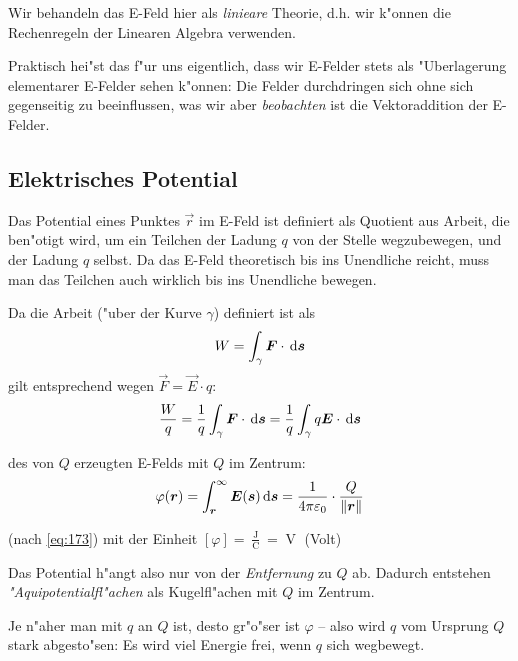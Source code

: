 Wir behandeln das E-Feld hier als \emph{linieare} Theorie, d.h. wir
k"onnen die Rechenregeln der Linearen Algebra verwenden.

Praktisch hei"st das f"ur uns eigentlich, dass wir E-Felder stets als
"Uberlagerung elementarer E-Felder sehen k"onnen: Die Felder
durchdringen sich ohne sich gegenseitig zu beeinflussen, was wir aber
\emph{beobachten} ist die Vektoraddition der E-Felder.





\subsection{Elektrisches Potential}
\label{kap_elektrisches-potential}

Das Potential eines Punktes $\vec r$ im E-Feld ist definiert als
Quotient aus Arbeit, die ben"otigt wird, um ein Teilchen der Ladung $q$
von der Stelle wegzubewegen, und der Ladung $q$ selbst. Da das E-Feld
theoretisch bis ins Unendliche reicht, muss man das Teilchen auch
wirklich bis ins Unendliche bewegen.

Da die Arbeit ("uber der Kurve $\gamma$) definiert ist als
$$
W = \int_\gamma \boldsymbol{F} \cdot \, \mathrm{d} \boldsymbol{s}
$$
gilt entsprechend wegen $ \vec F = \vec E \cdot q$:
\begin{equation*}
   \label{eq:186}
   \frac{W}{q} = \frac{1}{q} \int_\gamma \boldsymbol{F} \cdot \, \mathrm{d} \boldsymbol{s} =
 \frac{1}{q} \int_\gamma q \boldsymbol{E} \cdot \, \mathrm{d} \boldsymbol{s}
\end{equation*}

\begin{Def}
   des von $Q$ erzeugten E-Felds mit $Q$ im Zentrum:
\begin{equation}
   \label{eq:177}
   \varphi(\boldsymbol{r}) = \int_{\boldsymbol{r}}^\infty \boldsymbol{E}(\boldsymbol{s}) \, \mathrm{d} \boldsymbol{s}
   = \frac{1}{4\pi\varepsilon_0} \cdot \frac{Q}{\|\boldsymbol{r}\|}
\end{equation}
\end{Def}
(nach \eqref{eq:173}) mit der Einheit $[\varphi] = \frac{\operatorname{J}}{\operatorname{C}} =
\operatorname{V}$ (Volt)

Das Potential h"angt also nur von der \emph{Entfernung} zu $Q$
ab. Dadurch entstehen
\emph{"Aquipotentialfl"achen} als
Kugelfl"achen mit $Q$ im Zentrum.

Je n"aher man mit $q$ an $Q$ ist, desto gr"o"ser ist $\varphi$ -- also
wird $q$ vom Ursprung $Q$ stark abgesto"sen: Es wird viel Energie frei,
wenn $q$ sich wegbewegt.

